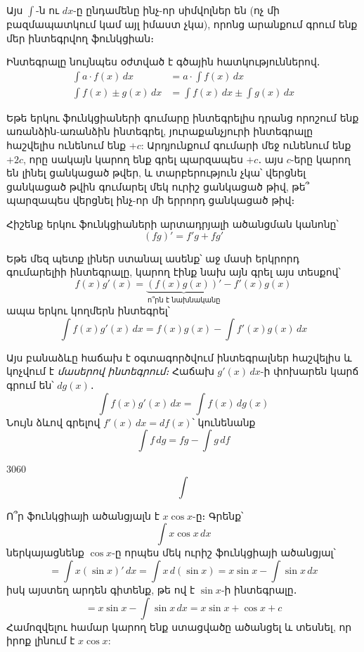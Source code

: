 Այս $\int$-ն ու $dx$-ը ընդամենը ինչ-որ սիմվոլներ են (ոչ մի բազմապատկում կամ այլ իմաստ չկա), որոնց արանքում գրում ենք մեր ինտեգրվող ֆունկցիան։ 


Ինտեգրալը նույնպես օժտված է գծային հատկություններով․
\begin{align*}
\int a \cdot f(x) \,dx &= a \cdot \int  f(x) \,dx
\\\int f(x) \pm g(x) \,dx &= \int f(x) \,dx \pm \int g(x) \,dx
\end{align*}

Եթե երկու ֆունկցիաների գումարը ինտեգրելիս դրանց որոշում ենք առանձին-առանձին ինտեգրել, յուրաքանչյուրի ինտեգրալը հաշվելիս ունենում ենք $+c$: Արդյունքում գումարի մեջ ունենում ենք $+2c$, որը սակայն կարող ենք գրել պարզապես $+c$․ այս $c$-երը կարող են լինել ցանկացած թվեր, և տարբերություն չկա՝  վերցնել ցանկացած թվին գումարել մեկ ուրիշ ցանկացած թիվ, թե՞ պարզապես վերցնել ինչ-որ մի երրորդ ցանկացած թիվ։


Հիշենք երկու ֆունկցիաների արտադրյալի ածանցման կանոնը՝ 
\[
(fg)'=f'g+fg'
\]

Եթե մեզ պետք լիներ ստանալ ասենք՝ աջ մասի երկրորդ գումարելիի ինտեգրալը, կարող էինք նախ այն գրել այս տեսքով՝
\[
f(x)g'(x) = \underbrace{(f(x)g(x))'}_{\text{ո՞րն է նախնականը}} - f'(x)g(x)
\]
ապա երկու կողմերն ինտեգրել՝
\[
\int f(x)g'(x) \, dx = f(x)g(x) - \int f'(x)g(x) \, dx
\]

Այս բանաձևը հաճախ է օգտագործվում ինտեգրալներ հաշվելիս և կոչվում է \textit{մասերով ինտեգրում։} Հաճախ $g'(x)\,dx$-ի փոխարեն կարճ գրում են՝ $dg(x)$․
\[
\int f(x)g'(x) \, dx = \int f(x)\, dg(x)
\]
Նույն ձևով գրելով $f'(x)\, dx = df(x)$՝ կունենանք
\[
\int f\, dg = fg - \int g\, df
\]

\begin{marginfigure}
    {\centering \@setfontsize\Huge{30}{60}\[\int \]}
    \caption*{ինտեգրալը կիրառվում է նաև \href{https://youtu.be/o4-3_JoXiVU?feature=shared&t=481}{կյանքում}}
\end{marginfigure}

\begin{example}
Ո՞ր ֆունկցիայի ածանցյալն է $x\cos x$-ը։ Գրենք՝
\[
\int x \cos x\, dx 
\]
ներկայացնենք $\cos x$-ը որպես մեկ ուրիշ ֆունկցիայի ածանցյալ՝ 
\[
=
\int x (\sin x)'\, dx 
=
\int x \,d (\sin x)
=
x \sin x-\int \sin x\, dx
\]
իսկ այստեղ արդեն գիտենք, թե ով է $\sin x$-ի ինտեգրալը․
\[
=
x \sin x-\int \sin x\, dx
= 
x \sin x + \cos x + c
\]
Համոզվելու համար կարող ենք ստացվածը ածանցել և տեսնել, որ իրոք լինում է $x \cos x$: 
\end{example}

